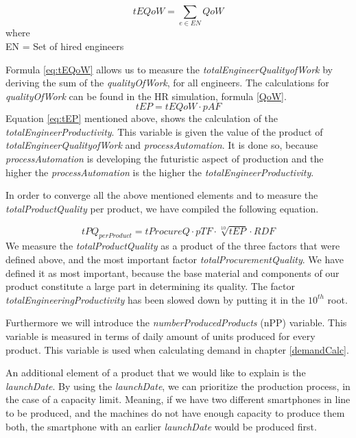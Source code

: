 \begin{center}
\begin{equation}
tEQoW=\sum_{e \in EN}{QoW}
\label{eq:tEQoW}
\end{equation}
where \\
\gls{EN} = Set of hired engineers
\end{center}
Formula \ref{eq:tEQoW} allows us to measure the \textit{totalEngineerQualityofWork} by deriving the sum of the \textit{qualityOfWork}, for all engineers. The calculations for \textit{qualityOfWork} can be found in the HR simulation, formula \ref{QoW}.
\begin{equation}
tEP=tEQoW \cdot pAF
\label{eq:tEP}
\end{equation}
Equation \ref{eq:tEP} mentioned above, shows the calculation of the \textit{totalEngineerProductivity}. This variable is given the value of the product of \textit{totalEngineerQualityofWork} and \textit{processAutomation}. It is done so, because \textit{processAutomation} is developing the futuristic  aspect of production and the higher the \textit{processAutomation} is the higher the \textit{totalEngineerProductivity}. 

In order to converge all the above mentioned elements and to measure the \textit{totalProductQuality} per product, we have compiled the following equation. 

\begin{equation}
tPQ_{perProduct} = tProcureQ \cdot pTF \cdot \sqrt[10]{tEP} \cdot  RDF
\label{eq:PQ}
\end{equation}
 We measure the \textit{totalProductQuality} as a product of the three factors that were defined above, and the most important factor \textit{totalProcurementQuality}. We have defined it as most important, because the base material and components of our product constitute a large part in determining its quality.
 The factor \textit{totalEngineeringProductivity} has been slowed down by putting it in the $10^{th}$ root. 
 
 Furthermore we will introduce the \textit{numberProducedProducts} (\gls{nPP}) variable. This variable is measured in terms of daily amount of units produced for every product. This variable is used when calculating demand in chapter \ref{demandCalc}. 
 
 An additional element of a product that we would like to explain is the \textit{launchDate}. By using the \textit{launchDate}, we can prioritize the production process, in the case of a capacity limit. Meaning, if we have two different smartphones in line to be produced, and the machines do not have enough capacity to produce them both, the smartphone with an earlier \textit{launchDate} would be produced first.

